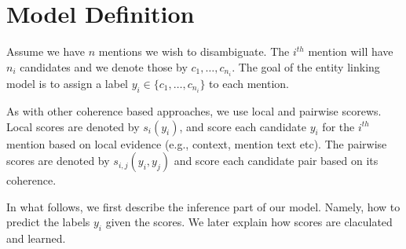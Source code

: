 \section{Model Definition}
Assume we have $n$ mentions we wish to disambiguate. The $i^{th}$ mention will have $n_i$ candidates and we denote those by $c_1,\ldots, c_{n_i}$. The goal 
of the entity linking model is to assign a label $y_i\in \{c_1,\ldots, c_{n_i}\}$ to each mention.

As with other coherence based approaches, we use local and pairwise scorews. Local scores are denoted by $s_i(y_i)$, and score each candidate $y_i$ for the $i^{th}$ mention based on local evidence (e.g., context, mention text etc). The pairwise scores are denoted by $s_{i,j}(y_i,y_j)$ and score each candidate pair based on its coherence. 

In what follows, we first describe the inference part of our model. Namely, how to predict the labels $y_i$ given the scores. We later explain how scores are claculated and learned.
